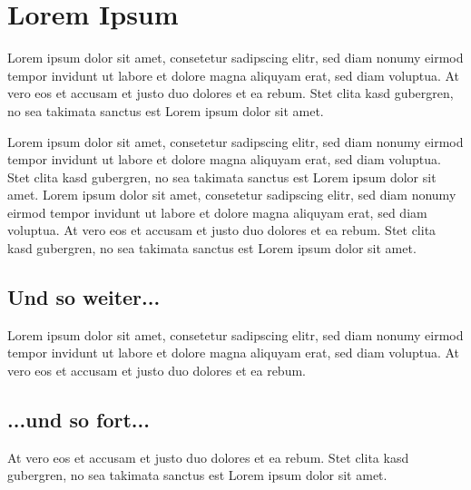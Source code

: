 \chapter{Lorem Ipsum}
\label{ch:li}

Lorem ipsum dolor sit amet, consetetur sadipscing elitr, sed diam nonumy eirmod tempor invidunt ut labore et dolore magna aliquyam erat, sed diam voluptua. At vero eos et accusam et justo duo dolores et ea rebum. 
Stet clita kasd gubergren, no sea takimata sanctus est Lorem ipsum dolor sit amet.

Lorem ipsum dolor sit amet, consetetur sadipscing elitr, sed diam nonumy eirmod tempor invidunt ut labore et dolore magna aliquyam erat, sed diam voluptua. 
Stet clita kasd gubergren, no sea takimata sanctus est Lorem ipsum dolor sit amet. 
Lorem ipsum dolor sit amet, consetetur sadipscing elitr, sed diam nonumy eirmod tempor invidunt ut labore et dolore magna aliquyam erat, sed diam voluptua. 
At vero eos et accusam et justo duo dolores et ea rebum. 
Stet clita kasd gubergren, no sea takimata sanctus est Lorem ipsum dolor sit amet.


\section{Und so weiter...}

Lorem ipsum dolor sit amet, consetetur sadipscing elitr, sed diam nonumy eirmod tempor invidunt ut labore et dolore magna aliquyam erat, sed diam voluptua. 
At vero eos et accusam et justo duo dolores et ea rebum.

\section{...und so fort...}

At vero eos et accusam et justo duo dolores et ea rebum. 
Stet clita kasd gubergren, no sea takimata sanctus est Lorem ipsum dolor sit amet.